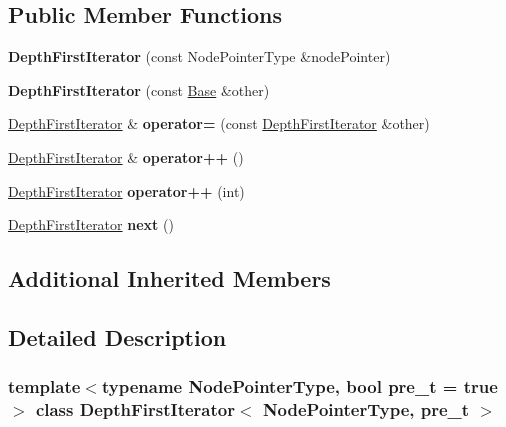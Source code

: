 \subsection*{Public Member Functions}
\begin{DoxyCompactItemize}
\item 
\mbox{\label{classDepthFirstIterator_ac80601bcd500392940c074aeae8547ff}} 
{\bfseries Depth\+First\+Iterator} (const Node\+Pointer\+Type \&node\+Pointer)
\item 
\mbox{\label{classDepthFirstIterator_a1e408b91785d9b952b06629f407d3a56}} 
{\bfseries Depth\+First\+Iterator} (const \mbox{\hyperlink{structnode__iterator__base}{Base}} \&other)
\item 
\mbox{\label{classDepthFirstIterator_a575ad91d4dbe837f93dc4fc71a24ca9a}} 
\mbox{\hyperlink{classDepthFirstIterator}{Depth\+First\+Iterator}} \& {\bfseries operator=} (const \mbox{\hyperlink{classDepthFirstIterator}{Depth\+First\+Iterator}} \&other)
\item 
\mbox{\label{classDepthFirstIterator_ae3052a59e0e2dbf5900cfa5042c095c3}} 
\mbox{\hyperlink{classDepthFirstIterator}{Depth\+First\+Iterator}} \& {\bfseries operator++} ()
\item 
\mbox{\label{classDepthFirstIterator_a2493eea0028c46fc9f3d819545d00a9a}} 
\mbox{\hyperlink{classDepthFirstIterator}{Depth\+First\+Iterator}} {\bfseries operator++} (int)
\item 
\mbox{\label{classDepthFirstIterator_abb23e86fa77a7812b95211fb437a9b3c}} 
\mbox{\hyperlink{classDepthFirstIterator}{Depth\+First\+Iterator}} {\bfseries next} ()
\end{DoxyCompactItemize}
\subsection*{Additional Inherited Members}


\subsection{Detailed Description}
\subsubsection*{template$<$typename Node\+Pointer\+Type, bool pre\+\_\+t = true$>$\newline
class Depth\+First\+Iterator$<$ Node\+Pointer\+Type, pre\+\_\+t $>$}

